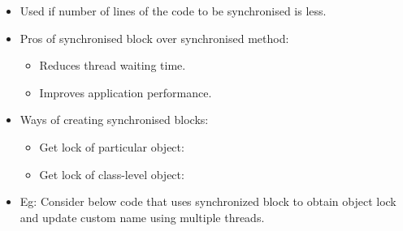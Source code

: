 \setlength{\columnsep}{3pt}
\begin{flushleft}

	\begin{itemize}
		\item Used if number of lines of the code to be synchronised is less.
		\item Pros of synchronised block over synchronised method:
		\begin{itemize}
			\item Reduces thread waiting time.
			\item Improves application performance.
		\end{itemize}
		\item Ways of creating synchronised blocks:
		\begin{itemize}
			\item Get lock of particular object:
			\bigskip
			\item Get lock of class-level object:
			\bigskip
		\end{itemize}
		\item Eg: Consider below code that uses synchronized block to obtain object lock and update custom name using multiple threads.
		\bigskip
		\newpage
\end{itemize}
\end{flushleft}
